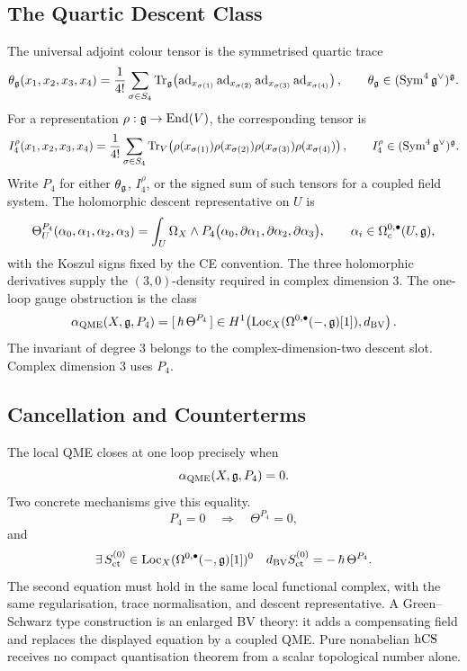 \subsection{The Quartic Descent Class}
\label{subsec:hcs-quartic-descent-class}

The universal adjoint colour tensor is the symmetrised quartic trace
\[
  \theta_{\mathfrak{g}}(x_1,x_2,x_3,x_4)
  =
  \frac{1}{4!}\sum_{\sigma\in S_4}
  \operatorname{Tr}_{\mathfrak{g}}\!\left(
    \operatorname{ad}_{x_{\sigma(1)}}
    \operatorname{ad}_{x_{\sigma(2)}}
    \operatorname{ad}_{x_{\sigma(3)}}
    \operatorname{ad}_{x_{\sigma(4)}}
  \right),
  \qquad
  \theta_{\mathfrak{g}}\in(\operatorname{Sym}^4\mathfrak{g}^\vee)^{\mathfrak{g}} .
\]
For a representation \(\rho:\mathfrak{g}\to\operatorname{End}(V)\), the corresponding tensor is
\[
  I_4^\rho(x_1,x_2,x_3,x_4)
  =
  \frac{1}{4!}\sum_{\sigma\in S_4}
  \operatorname{Tr}_V\!\left(
    \rho(x_{\sigma(1)})\rho(x_{\sigma(2)})
    \rho(x_{\sigma(3)})\rho(x_{\sigma(4)})
  \right),
  \qquad
  I_4^\rho\in(\operatorname{Sym}^4\mathfrak{g}^\vee)^{\mathfrak{g}} .
\]
Write \(P_4\) for either \(\theta_{\mathfrak{g}}\), \(I_4^\rho\), or the signed
sum of such tensors for a coupled field system. The holomorphic descent
representative on \(U\) is
\[
  \Theta^{P_4}_U(\alpha_0,\alpha_1,\alpha_2,\alpha_3)
  =
  \int_U
  \Omega_X\wedge
  P_4\bigl(\alpha_0,\partial\alpha_1,
  \partial\alpha_2,\partial\alpha_3\bigr),
  \qquad
  \alpha_i\in\Omega^{0,\bullet}_c(U,\mathfrak{g}),
\]
with the Koszul signs fixed by the CE convention. The three
holomorphic derivatives supply the \((3,0)\)-density required in
complex dimension \(3\). The one-loop gauge obstruction is the class
\[
  \alpha_{\mathrm{QME}}(X,\mathfrak{g},P_4)
  =
  [\,\hbar\,\Theta^{P_4}\,]
  \in
  H^1\!\left(
    \mathrm{Loc}_{X}(\Omega^{0,\bullet}(-,\mathfrak{g})[1]),
    d_{\mathrm{BV}}
  \right).
\]
The invariant of degree \(3\) belongs to the complex-dimension-two
descent slot. Complex dimension \(3\) uses \(P_4\).

\subsection{Cancellation and Counterterms}
\label{subsec:hcs-cancellation-counterterms}

The local QME closes at one loop precisely when
\[
  \alpha_{\mathrm{QME}}(X,\mathfrak{g},P_4)=0 .
\]
Two concrete mechanisms give this equality.
\[
  P_4=0
  \quad\Longrightarrow\quad
  \Theta^{P_4}=0,
\]
and
\[
  \exists\,S_{\mathrm{ct}}^{(0)}\in
  \mathrm{Loc}_{X}(\Omega^{0,\bullet}(-,\mathfrak{g})[1])^0
  \quad
  d_{\mathrm{BV}}S_{\mathrm{ct}}^{(0)}
  =
  -\,\hbar\,\Theta^{P_4}.
\]
The second equation must hold in the same local functional complex,
with the same regularisation, trace normalisation, and descent
representative. A Green--Schwarz type construction is an enlarged BV
theory: it adds a compensating field and replaces the displayed
equation by a coupled QME. Pure nonabelian \(\mathrm{hCS}\) receives no compact
quantisation theorem from a scalar topological number alone.

